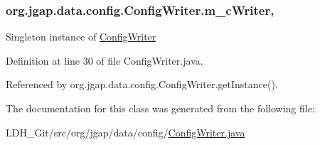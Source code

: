 \hypertarget{classorg_1_1jgap_1_1data_1_1config_1_1_config_writer_aba5e5293462bc2d6d178ff26790c5dd4}{
\subsubsection[{m\-\_\-c\-Writer}]{ org.\-jgap.\-data.\-config.\-Config\-Writer.\-m\-\_\-c\-Writer\hspace{0.3cm}{\ttfamily [static]}, {\ttfamily [private]}}}\label{classorg_1_1jgap_1_1data_1_1config_1_1_config_writer_aba5e5293462bc2d6d178ff26790c5dd4}
Singleton instance of \hyperlink{classorg_1_1jgap_1_1data_1_1config_1_1_config_writer}{Config\-Writer} 

Definition at line 30 of file Config\-Writer.\-java.



Referenced by org.\-jgap.\-data.\-config.\-Config\-Writer.\-get\-Instance().



The documentation for this class was generated from the following file\-:\begin{DoxyCompactItemize}
\item 
L\-D\-H\-\_\-\-Git/src/org/jgap/data/config/\hyperlink{_config_writer_8java}{Config\-Writer.\-java}\end{DoxyCompactItemize}
